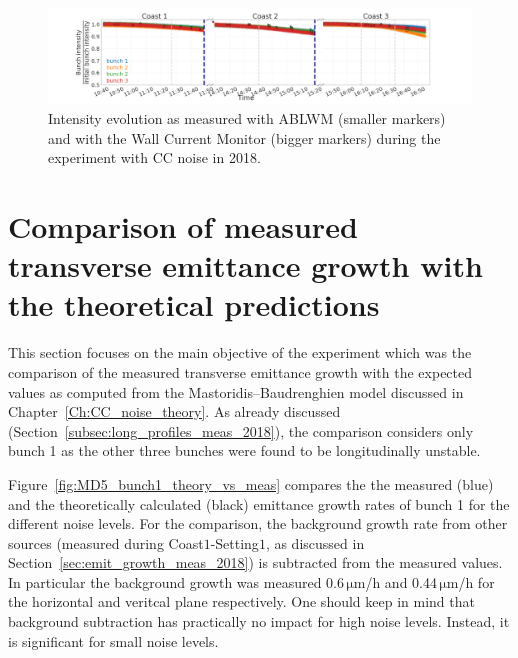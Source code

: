 \begin{figure}
   \centering
   \includegraphics[width=1.0\textwidth]{images/Ch5/MD5_overview_intensity_with_wall_current_monitor.png}
   \caption{Intensity evolution as measured with ABLWM (smaller markers) and with the Wall Current Monitor (bigger markers) during the experiment with CC noise in 2018.}
   \label{fig:MD5_overview_intensity}
\end{figure}

\section{Comparison of measured transverse emittance growth with the theoretical predictions}\label{sec:meas_2018_vs_theory}
This section focuses on the main objective of the experiment which was the comparison of the measured transverse emittance growth with the expected values as computed from the Mastoridis--Baudrenghien model discussed in Chapter~\ref{Ch:CC_noise_theory}. As already discussed (Section~\ref{subsec:long_profiles_meas_2018}), the comparison considers only bunch 1 as the other three bunches were found to be longitudinally unstable.

Figure~\ref{fig:MD5_bunch1_theory_vs_meas} compares the the measured (blue) and the theoretically calculated (black) emittance growth rates of bunch 1 for the different noise levels. For the comparison, the background growth rate from other sources (measured during Coast$1$-Setting$1$, as discussed in Section~\ref{sec:emit_growth_meas_2018}) is subtracted from the measured values. In particular the background growth was measured 0.6\,$\mathrm{\mu m}$/h and 0.44\,$\mathrm{\mu m}$/h for the horizontal and veritcal plane respectively. One should keep in mind that background subtraction has practically no impact for high noise levels. Instead, it is significant for small noise levels.


